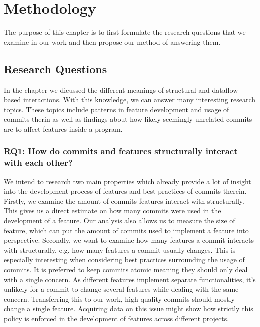 \chapter{Methodology}\label{ch:methodology}

The purpose of this chapter is to first formulate the research questions that we examine in our work
and then propose our method of answering them.

\section{Research Questions}\label{sec:research_questions}

In the  chapter we dicussed the different meanings of structural and dataflow-based interactions.
With this knowledge, we can answer many interesting research topics. 
These topics include patterns in feature development and usage of commits therin as well as findings about how likely seemingly unrelated commits are to affect features inside a program.

\subsection*{\textbf{RQ1: How do commits and features structurally interact with each other?}}

We intend to research two main properties which already provide a lot of insight into the development process of features and best practices of commits therein.
Firstly, we examine the amount of commits features interact with structurally.
This gives us a direct estimate on how many commits were used in the development of a feature.
Our analysis also allows us to measure the size of feature, which can put the amount of commits used to implement a feature into perspective.
Secondly, we want to examine how many features a commit interacts with structurally, e.g. how many features a commit usually changes. 
This is especially interesting when considering best practices surrounding the usage of commits.
It is preferred to keep commits atomic\cite{hundhausen2021commit_metrics} meaning they should only deal with a single concern.
As different features implement separate functionalities, it's unlikely for a commit to change several features while dealing with the same concern.
Transferring this to our work, high quality commits should mostly change a single feature.
Acquiring data on this issue might show how strictly this policy is enforced in the development of features across different projects. 

